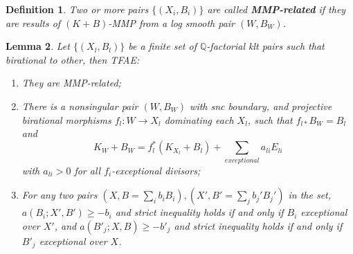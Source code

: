\documentclass{article}
\newtheorem{defn}{Definition}[subsection]
\newtheorem{lem}[defn]{Lemma}
\newtheorem{rmk}[defn]{Remark}
\begin{document}
\begin{defn}
  \cite[Definition 3.3]{brunoLogSarkisovProgram1995}
  Two or more pairs $ \{(X_i,B_i)\} $ are called \textbf{MMP-related} if they are results of $ (K+B) $-MMP from a log smooth pair $(W,B_{W})$.
\end{defn}
  
 \begin{lem}\label{MMPrelatedConditation}
  \cite[Proposition 3.4]{brunoLogSarkisovProgram1995}
  Let $ \{(X_l,B_l)\} $ be a finite set of $ \mathbb{Q} $-factorial klt pairs such that birational to other, then TFAE:
  \begin{enumerate}
    \item They are MMP-related;
    \item There is a nonsingular pair $ (W,B_W) $ with snc boundary, and projective birational morphisms $ f_l:W\to  X_l $ dominating each $ X_l $, such that $ f_{l*}B_W=B_l $ and
      \[ K_W+B_W=f_l^*(K_{X_l}+B_l)+\sum_{exceptional}{a_{li}E_{li}} \]
      with $ a_{li}>0 $ for all $ f_i $-exceptional divisors;
    \item For any two pairs $ (X,B=\sum_ib_iB_i),(X',B'=\sum _jb_j'B_j') $ in the set,  $ a(B_i;X',B')\geqslant -b_i $ and strict inequality holds if and only if $ B_i $ exceptional over $ X' $, and $ a(B'_j;X,B)\geqslant -b'_j $ and strict inequality holds if and only if $ B'_j $ exceptional over $ X $.
  \end{enumerate}
\end{lem}
\end{document}

